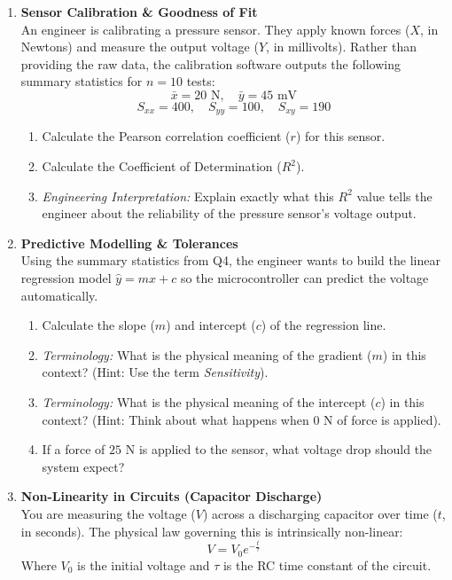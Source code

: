 \begin{enumerate}[label=\textbf{Q\arabic*.}, leftmargin=*, start=4]

    \item \textbf{Sensor Calibration \& Goodness of Fit} \\
    An engineer is calibrating a pressure sensor. They apply known forces ($X$, in Newtons) and measure the output voltage ($Y$, in millivolts). Rather than providing the raw data, the calibration software outputs the following summary statistics for $n=10$ tests:
    \[ \bar{x} = 20\text{ N}, \quad \bar{y} = 45\text{ mV} \]
    \[ S_{xx} = 400, \quad S_{yy} = 100, \quad S_{xy} = 190 \]
    \begin{enumerate}[label=\arabic*.]
        \item Calculate the Pearson correlation coefficient ($r$) for this sensor.
        \item Calculate the Coefficient of Determination ($R^2$).
        \item \textit{Engineering Interpretation:} Explain exactly what this $R^2$ value tells the engineer about the reliability of the pressure sensor's voltage output. 
    \end{enumerate}
    \vspace{0.3cm}

    \item \textbf{Predictive Modelling \& Tolerances} \\
    Using the summary statistics from Q4, the engineer wants to build the linear regression model $\hat{y} = mx + c$ so the microcontroller can predict the voltage automatically.
    \begin{enumerate}[label=\arabic*.]
        \item Calculate the slope ($m$) and intercept ($c$) of the regression line.
        \item \textit{Terminology:} What is the physical meaning of the gradient ($m$) in this context? (Hint: Use the term \textit{Sensitivity}).
        \item \textit{Terminology:} What is the physical meaning of the intercept ($c$) in this context? (Hint: Think about what happens when $0\text{ N}$ of force is applied).
        \item If a force of $25\text{ N}$ is applied to the sensor, what voltage drop should the system expect?
    \end{enumerate}
    \vspace{0.3cm}

    \item \textbf{Non-Linearity in Circuits (Capacitor Discharge)} \\
    You are measuring the voltage ($V$) across a discharging capacitor over time ($t$, in seconds). The physical law governing this is intrinsically non-linear:
    \[ V = V_0 e^{-\frac{t}{\tau}} \]
    Where $V_0$ is the initial voltage and $\tau$ is the RC time constant of the circuit. 
    

\end{enumerate}
